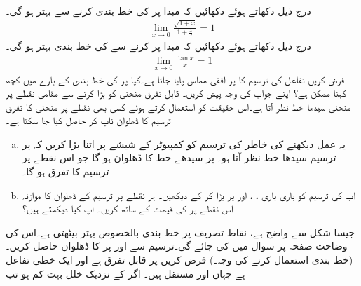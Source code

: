 \\
درج ذیل دکھاتے ہوئے دکھائیں کہ مبدا پر  کی  خط بندی  کرنے سے بہتر ہو گی۔
\begin{align*}
\lim_{x\to0}\frac{\sqrt{1+x}}{1+\tfrac{x}{2}}=1
\end{align*}
درج ذیل دکھاتے ہوئے دکھائیں کہ مبدا پر  کرنے سے  کی خط بندی بہتر ہو گی۔
\begin{align*}
\lim_{x\to 0}\frac{\tan x}{x}=1
\end{align*}
فرض کریں تفاعل  کی ترسیم کا  پر افقی مماس پایا جاتا ہے۔کیا  پر  کی خط بندی کے بارے میں کچھ کہنا ممکن ہے؟ اپنے جواب کی وجہ پیش کریں۔
\quad
قابل تفرق منحنی کو بڑا کرنے سے  مقامی نقطے پر منحنی سیدھا خط   نظر آتا ہے۔اس حقیقت کو استعمال کرتے ہوئے کسی بھی نقطے پر منحنی کا تفرق ترسیم کا  ڈھلوان ناپ کر حاصل کیا جا سکتا ہے۔ 
\begin{enumerate}[a.]
\item
یہ عمل دیکھنے کی خاطر  کی ترسیم کو کمپیوٹر کے شیشے پر  اتنا بڑا کریں کہ  پر ترسیم سیدھا خط نظر آتا ہو۔  پر  سیدھے خط کا ڈھلوان  ہو گا جو اس نقطے پر ترسیم کا تفرق ہو گا۔
\item
اب  کی ترسیم کو باری باری ، ، اور  پر بڑا کر کے دیکھیں۔ ہر نقطے پر ترسیم کے  ڈھلوان کا موازنہ اس نقطے پر  کی قیمت کے ساتھ کریں۔ آپ کیا دیکھتے ہیں؟
\end{enumerate}
\quad
جیسا شکل  سے واضح ہے، نقاط تصریف پر خط بندی بالخصوص بہتر بیٹھتی ہے۔اس کی وضاحت صفحہ  پر   سوال  میں کی جائے گی۔ترسیم سے  اور  پر  کا ڈھلوان حاصل کریں۔
 (خط بندی استعمال کرنے کی وجہ۔)\quad
فرض کریں  پر  قابل تفرق ہے اور  ایک خطی تفاعل ہے جہاں  اور  مستقل ہیں۔ اگر  کے نزدیک خلل  بہت کم ہو تب

